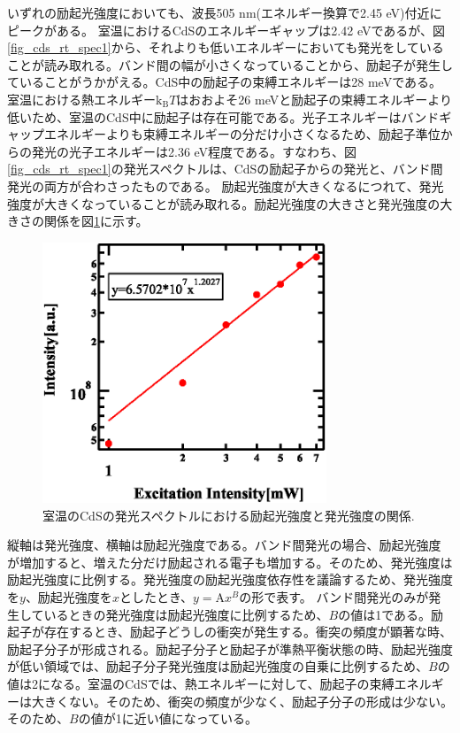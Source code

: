 \documentclass[11pt,a4j]{jsarticle}
\begin{document}
いずれの励起光強度においても、波長505 nm(エネルギー換算で2.45 eV)付近にピークがある。
室温におけるCdSのエネルギーギャップは2.42 eVである\cite{gapE}が、図\ref{fig_cds_rt_spec1}から、それよりも低いエネルギーにおいても発光をしていることが読み取れる。バンド間の幅が小さくなっていることから、励起子が発生していることがうかがえる。CdS中の励起子の束縛エネルギーは28 meVである\cite{exciton}。室温における熱エネルギー$\mathrm{k_{B}}T$はおおよそ26 meVと励起子の束縛エネルギーより低いため、室温のCdS中に励起子は存在可能である。光子エネルギーはバンドギャップエネルギーよりも束縛エネルギーの分だけ小さくなるため、励起子準位からの発光の光子エネルギーは2.36 eV程度である。すなわち、図\ref{fig_cds_rt_spec1}の発光スペクトルは、CdSの励起子からの発光と、バンド間発光の両方が合わさったものである。
励起光強度が大きくなるにつれて、発光強度が大きくなっていることが読み取れる。励起光強度の大きさと発光強度の大きさの関係を図\ref{fig_cds_rt_int1}に示す。

\begin{figure}[ht]
 \centering
 \includegraphics[clip,width=8.5cm]{start2_CdS_rt_Int.eps}
 \caption{室温のCdSの発光スペクトルにおける励起光強度と発光強度の関係.}
 \label{fig_cds_rt_int1}
\end{figure}

\newpage
縦軸は発光強度、横軸は励起光強度である。バンド間発光の場合、励起光強度が増加すると、増えた分だけ励起される電子も増加する。そのため、発光強度は励起光強度に比例する。発光強度の励起光強度依存性を議論するため、発光強度を$y$、励起光強度を$x$としたとき、$y=\mathrm{A}x^{B}$の形で表す。
バンド間発光のみが発生しているときの発光強度は励起光強度に比例するため、$B$の値は1である。励起子が存在するとき、励起子どうしの衝突が発生する。衝突の頻度が顕著な時、励起子分子が形成される。励起子分子と励起子が準熱平衡状態の時、励起光強度が低い領域では、励起子分子発光強度は励起光強度の自乗に比例するため、$B$の値は2になる。室温のCdSでは、熱エネルギーに対して、励起子の束縛エネルギーは大きくない。そのため、衝突の頻度が少なく、励起子分子の形成は少ない。そのため、$B$の値が1に近い値になっている。
\end{document}
